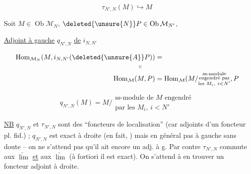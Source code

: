 
\[
 \tau_{N',N}(M)\hookrightarrow M
\]

Soit $M\in\operatorname{Ob}\mathcal M_N$, $\deleted{\unsure{N}}P\in\operatorname{Ob}\mathcal M_{N'}$,


\uline{Adjoint à gauche} $q_{N',N}$ \uline{de} $i_{N,N'}$

\[
 \begin{aligned}
 \operatorname{Hom}_{\mathcal M_N}(M,i_{N,N'}(\deleted{\unsure{A}}P))&=\\[-2pt]
 \shortparallel\qquad &\\[-2pt]
 \operatorname{Hom}_{\mathcal M}(M,P)&=\operatorname{Hom}_{\mathcal M}(M/\substack{\text{ss-module}\\\text{engendré par}\\\text{les }M_i,\ i<N'},P
 \end{aligned}
\]


\[
 q_{N',N}(M)=M/\substack{\text{ss-module de }M\text{ engendré}\\\text{par les }M_i,\ i<N'}
\]

\uline{NB} $q_{N',N}$ et $\tau_{N',N}$ sont des ``foncteurs de localisation'' (car adjoints d'un foncteur pl. fid.) ;  $q_{N',N}$ est exact à droite (en fait, ) mais en général pas à gauche sans doute -- on ne s'attend pas qu'il ait encore un adj. à g. Par contre $\tau_{N',N}$ commute aux $\underleftarrow{\lim}$ \uline{et} aux $\underrightarrow{\lim}$ (à fortiori il est exact). On s'attend à en trouver un foncteur adjoint à droite.

